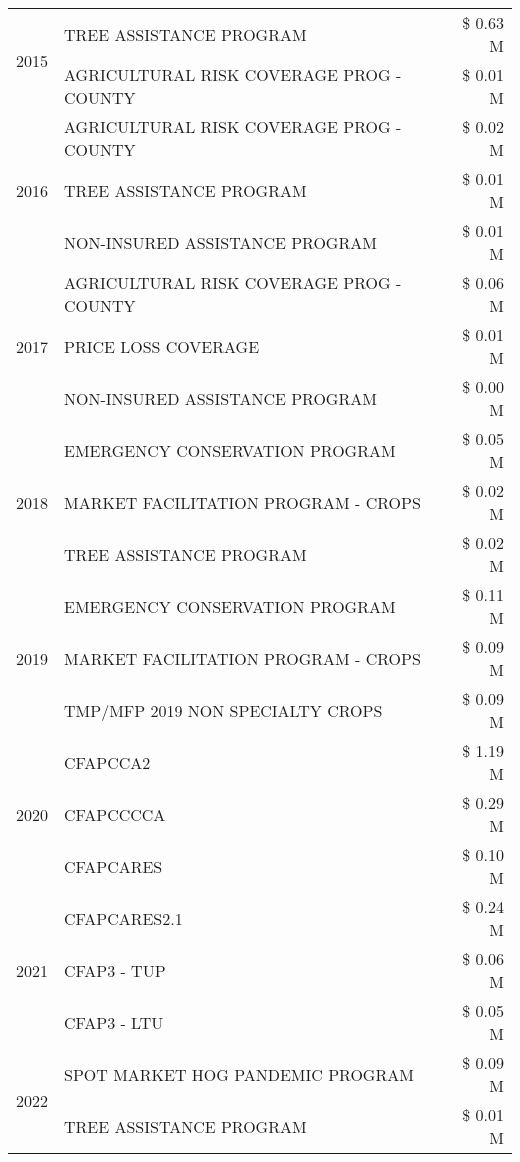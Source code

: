 \begin{tabular}{llr}
\cline{1-3}
\multirow[t]{2}{*}{2015} & TREE ASSISTANCE PROGRAM & \$ 0.63 M \\
 & AGRICULTURAL RISK COVERAGE PROG - COUNTY & \$ 0.01 M \\
\cline{1-3}
\multirow[t]{3}{*}{2016} & AGRICULTURAL RISK COVERAGE PROG - COUNTY & \$ 0.02 M \\
 & TREE ASSISTANCE PROGRAM & \$ 0.01 M \\
 & NON-INSURED ASSISTANCE PROGRAM & \$ 0.01 M \\
\cline{1-3}
\multirow[t]{3}{*}{2017} & AGRICULTURAL RISK COVERAGE PROG - COUNTY & \$ 0.06 M \\
 & PRICE LOSS COVERAGE & \$ 0.01 M \\
 & NON-INSURED ASSISTANCE PROGRAM & \$ 0.00 M \\
\cline{1-3}
\multirow[t]{3}{*}{2018} & EMERGENCY CONSERVATION PROGRAM & \$ 0.05 M \\
 & MARKET FACILITATION PROGRAM - CROPS & \$ 0.02 M \\
 & TREE ASSISTANCE PROGRAM & \$ 0.02 M \\
\cline{1-3}
\multirow[t]{3}{*}{2019} & EMERGENCY CONSERVATION PROGRAM & \$ 0.11 M \\
 & MARKET FACILITATION PROGRAM - CROPS & \$ 0.09 M \\
 & TMP/MFP 2019 NON SPECIALTY CROPS & \$ 0.09 M \\
\cline{1-3}
\multirow[t]{3}{*}{2020} & CFAPCCA2 & \$ 1.19 M \\
 & CFAPCCCCA & \$ 0.29 M \\
 & CFAPCARES & \$ 0.10 M \\
\cline{1-3}
\multirow[t]{3}{*}{2021} & CFAPCARES2.1 & \$ 0.24 M \\
 & CFAP3 - TUP & \$ 0.06 M \\
 & CFAP3 - LTU & \$ 0.05 M \\
\cline{1-3}
\multirow[t]{2}{*}{2022} & SPOT MARKET HOG PANDEMIC PROGRAM & \$ 0.09 M \\
 & TREE ASSISTANCE PROGRAM & \$ 0.01 M \\
\cline{1-3}
\bottomrule
\end{tabular}
